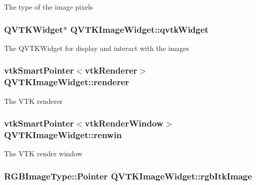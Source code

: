 The type of the image pixels \hypertarget{class_q_v_t_k_image_widget_a461f6ca20211ec9ff4b367aeb95e8139}{
\subsubsection[{qvtk\-Widget}]{\setlength{\rightskip}{0pt plus 5cm}Q\-V\-T\-K\-Widget$\ast$ {\bf Q\-V\-T\-K\-Image\-Widget\-::qvtk\-Widget}}}\label{d8/dd7/class_q_v_t_k_image_widget_a461f6ca20211ec9ff4b367aeb95e8139}
The Q\-V\-T\-K\-Widget for display and interact with the images \hypertarget{class_q_v_t_k_image_widget_a06c273e6e390e8e860fa4c0c932a2cf8}{
\subsubsection[{renderer}]{\setlength{\rightskip}{0pt plus 5cm}vtk\-Smart\-Pointer$<$vtk\-Renderer$>$ {\bf Q\-V\-T\-K\-Image\-Widget\-::renderer}}}\label{d8/dd7/class_q_v_t_k_image_widget_a06c273e6e390e8e860fa4c0c932a2cf8}
The V\-T\-K renderer \hypertarget{class_q_v_t_k_image_widget_a1ffdb2716a14bd2cb4dc845c50fc474c}{
\subsubsection[{renwin}]{\setlength{\rightskip}{0pt plus 5cm}vtk\-Smart\-Pointer$<$vtk\-Render\-Window$>$ {\bf Q\-V\-T\-K\-Image\-Widget\-::renwin}}}\label{d8/dd7/class_q_v_t_k_image_widget_a1ffdb2716a14bd2cb4dc845c50fc474c}
The V\-T\-K render window \hypertarget{class_q_v_t_k_image_widget_ae8cea614979ccdb6fe65551c8269b116}{
\subsubsection[{rgb\-Itk\-Image}]{\setlength{\rightskip}{0pt plus 5cm}R\-G\-B\-Image\-Type\-::\-Pointer {\bf Q\-V\-T\-K\-Image\-Widget\-::rgb\-Itk\-Image}}}\label{d8/dd7/class_q_v_t_k_image_widget_ae8cea614979ccdb6fe65551c8269b116}
